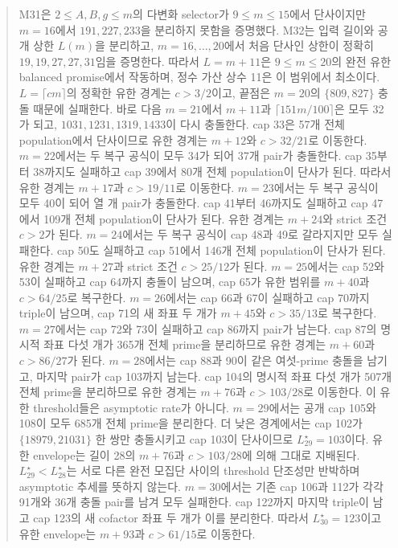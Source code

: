 \documentclass[11pt]{article}
\begin{document}
\begin{abstract}
M31은 \(2\le A,B,g\le m\)의 다변화 selector가
\(9\le m\le15\)에서 단사이지만 \(m=16\)에서
\(191,227,233\)을 분리하지 못함을 증명했다. M32는 입력 길이와
공개 상한 \(L(m)\)을 분리하고, \(m=16,\ldots,20\)에서 처음 단사인
상한이 정확히 \(19,19,27,27,31\)임을 증명한다. 따라서
\(L=m+11\)은 \(9\le m\le20\)의 완전 유한 balanced promise에서
작동하며, 정수 가산 상수 11은 이 범위에서 최소이다.
\(L=\lceil cm\rceil\)의 정확한 유한 경계는 \(c>3/2\)이고,
끝점은 \(m=20\)의 \(\{809,827\}\) 충돌 때문에 실패한다.
바로 다음 \(m=21\)에서 \(m+11\)과 \(\lceil151m/100\rceil\)은 모두
32가 되고, \(1031,1231,1319,1433\)이 다시 충돌한다. cap 33은
57개 전체 population에서 단사이므로 유한 경계는 \(m+12\)와
\(c>32/21\)로 이동한다.
\(m=22\)에서는 두 복구 공식이 모두 34가 되어 37개 pair가 충돌한다.
cap 35부터 38까지도 실패하고 cap 39에서 80개 전체 population이
단사가 된다. 따라서 유한 경계는 \(m+17\)과 \(c>19/11\)로 이동한다.
\(m=23\)에서는 두 복구 공식이 모두 40이 되어 열 개 pair가 충돌한다.
cap 41부터 46까지도 실패하고 cap 47에서 109개 전체 population이
단사가 된다. 유한 경계는 \(m+24\)와 strict 조건 \(c>2\)가 된다.
\(m=24\)에서는 두 복구 공식이 cap 48과 49로 갈라지지만 모두
실패한다. cap 50도 실패하고 cap 51에서 146개 전체 population이
단사가 된다. 유한 경계는 \(m+27\)과 strict 조건 \(c>25/12\)가 된다.
\(m=25\)에서는 cap 52와 53이 실패하고 cap 64까지 충돌이 남으며,
cap 65가 유한 범위를 \(m+40\)과 \(c>64/25\)로 복구한다.
\(m=26\)에서는 cap 66과 67이 실패하고 cap 70까지 triple이 남으며,
cap 71의 새 좌표 두 개가 \(m+45\)와 \(c>35/13\)로 복구한다.
\(m=27\)에서는 cap 72와 73이 실패하고 cap 86까지 pair가 남는다.
cap 87의 명시적 좌표 다섯 개가 365개 전체 prime을 분리하므로 유한
경계는 \(m+60\)과 \(c>86/27\)가 된다.
\(m=28\)에서는 cap 88과 90이 같은 여섯-prime 충돌을 남기고,
마지막 pair가 cap 103까지 남는다. cap 104의 명시적 좌표 다섯 개가
507개 전체 prime을 분리하므로 유한 경계는 \(m+76\)과
\(c>103/28\)로 이동한다. 이 유한 threshold들은
asymptotic rate가 아니다.
\(m=29\)에서는 공개 cap 105와 108이 모두 685개 전체 prime을
분리한다. 더 낮은 경계에서는 cap 102가
\(\{18979,21031\}\) 한 쌍만 충돌시키고 cap 103이 단사이므로
\(L_{29}^{\star}=103\)이다. 유한 envelope는 길이 28의
\(m+76\)과 \(c>103/28\)에 의해 그대로 지배된다.
\(L_{29}^{\star}<L_{28}^{\star}\)는 서로 다른 완전 모집단 사이의
threshold 단조성만 반박하며 asymptotic 추세를 뜻하지 않는다.
\(m=30\)에서는 기존 cap 106과 112가 각각 91개와 36개 충돌 pair를
남겨 모두 실패한다. cap 122까지 마지막 triple이 남고 cap 123의
새 cofactor 좌표 두 개가 이를 분리한다. 따라서
\(L_{30}^{\star}=123\)이고 유한 envelope는 \(m+93\)과
\(c>61/15\)로 이동한다.

\end{abstract}
\end{document}
